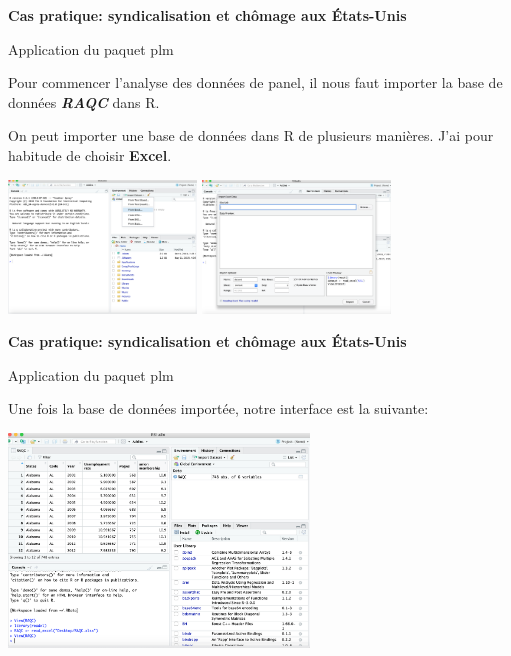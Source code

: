 \documentclass{beamer}
\begin{document}
\begin{frame}{\textbf{Cas pratique: syndicalisation et ch\^omage aux \'Etats-Unis}}
\begin{block}{Application du paquet plm}
\end{block}
Pour commencer l'analyse des donn\'ees de panel, il  nous faut importer la base de donn\'ees \textbf{\textit{RAQC}} dans R. \newline

On peut importer une base de donn\'ees dans R de plusieurs mani\`eres. J'ai pour habitude de choisir \textbf{Excel}. 
\begin{multicols}{2}
\includegraphics [width=5cm] {R2.png} 
\includegraphics [width=5cm] {R1.png} 
\end{multicols}
\end{frame} 
\begin{frame}{\textbf{Cas pratique: syndicalisation et ch\^omage aux \'Etats-Unis}}
\begin{block}{Application du paquet plm}
\end{block}
Une fois la base de donn\'ees import\'ee, notre interface est la suivante: 
\begin{center}
\includegraphics [width=8cm] {R3.png} 
\end{center}
\end{frame} 
\end{document}
